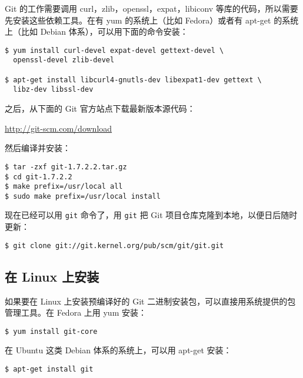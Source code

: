 \documentclass[a4paper]{book}
\begin{document}
Git 的工作需要调用 curl，zlib，openssl，expat，libiconv 等库的代码，所以需要先安装这些依赖工具。在有 yum 的系统上（比如 Fedora）或者有 apt-get 的系统上（比如 Debian 体系），可以用下面的命令安装：

\begin{shaded}\begin{verbatim}
$ yum install curl-devel expat-devel gettext-devel \
  openssl-devel zlib-devel

$ apt-get install libcurl4-gnutls-dev libexpat1-dev gettext \
  libz-dev libssl-dev
\end{verbatim}\end{shaded}

之后，从下面的 Git 官方站点下载最新版本源代码：

\url{http://git-scm.com/download}

然后编译并安装：

\begin{shaded}\begin{verbatim}
$ tar -zxf git-1.7.2.2.tar.gz
$ cd git-1.7.2.2
$ make prefix=/usr/local all
$ sudo make prefix=/usr/local install
\end{verbatim}\end{shaded}

现在已经可以用 \texttt{git} 命令了，用 \texttt{git} 把 Git 项目仓库克隆到本地，以便日后随时更新：

\begin{shaded}\begin{verbatim}
$ git clone git://git.kernel.org/pub/scm/git/git.git
\end{verbatim}\end{shaded}

\subsection{在 Linux 上安装}

如果要在 Linux 上安装预编译好的 Git 二进制安装包，可以直接用系统提供的包管理工具。在 Fedora 上用 yum 安装：

\begin{shaded}\begin{verbatim}
$ yum install git-core
\end{verbatim}\end{shaded}

在 Ubuntu 这类 Debian 体系的系统上，可以用 apt-get 安装：

\begin{shaded}\begin{verbatim}
$ apt-get install git
\end{verbatim}\end{shaded}
\end{document}
